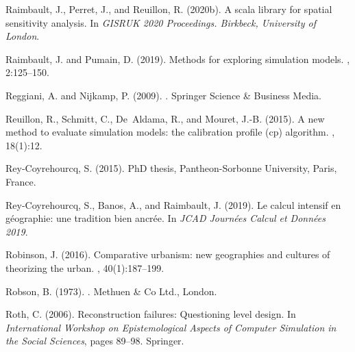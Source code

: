 \documentclass[10pt]{article}
\begin{document}
\begin{thebibliography}{}
Raimbault, J., Perret, J., and Reuillon, R. (2020b).
\newblock A scala library for spatial sensitivity analysis.
\newblock In {\em GISRUK 2020 Proceedings. Birkbeck, University of London}.

Raimbault, J. and Pumain, D. (2019).
\newblock Methods for exploring simulation models.
, 2:125--150.

Reggiani, A. and Nijkamp, P. (2009).
.
\newblock Springer Science \& Business Media.

Reuillon, R., Schmitt, C., De~Aldama, R., and Mouret, J.-B. (2015).
\newblock A new method to evaluate simulation models: the calibration profile
  (cp) algorithm.
,
  18(1):12.

Rey-Coyrehourcq, S. (2015).
\newblock PhD thesis, Pantheon-Sorbonne University, Paris, France.

Rey-Coyrehourcq, S., Banos, A., and Raimbault, J. (2019).
\newblock Le calcul intensif en g{\'e}ographie: une tradition bien ancr{\'e}e.
\newblock In {\em JCAD Journ{\'e}es Calcul et Donn{\'e}es 2019}.

Robinson, J. (2016).
\newblock Comparative urbanism: new geographies and cultures of theorizing the
  urban.
,
  40(1):187--199.

Robson, B. (1973).
.
\newblock Methuen \& Co Ltd., London.

Roth, C. (2006).
\newblock Reconstruction failures: Questioning level design.
\newblock In {\em International Workshop on Epistemological Aspects of Computer
  Simulation in the Social Sciences}, pages 89--98. Springer.


\end{thebibliography}
\end{document}
